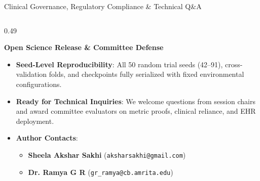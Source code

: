 \documentclass[aspectratio=169,10pt]{beamer}
\begin{document}
\begin{frame}{Clinical Governance, Regulatory Compliance \& Technical Q\&A}
\begin{columns}[t]
\begin{column}{0.49\textwidth}
\begin{exampleblock}{\textbf{Open Science Release \& Committee Defense}}
\begin{itemize}
          \item \textbf{Seed-Level Reproducibility}:
          All 50 random trial seeds (42--91), cross-validation folds, and checkpoints fully serialized with fixed environmental configurations.
          \item \textbf{Ready for Technical Inquiries}:
          We welcome questions from session chairs and award committee evaluators on metric proofs, clinical reliance, and EHR deployment.
          \item \textbf{Author Contacts}:
          \begin{itemize}\scriptsize
            \item \textbf{Sheela Akshar Sakhi} (\texttt{aksharsakhi@gmail.com})
            \item \textbf{Dr. Ramya G R} (\texttt{gr\_ramya@cb.amrita.edu})
          \end{itemize}
        \end{itemize}
      \end{exampleblock}
    \end{column}
  \end{columns}
\end{frame}
\end{document}
